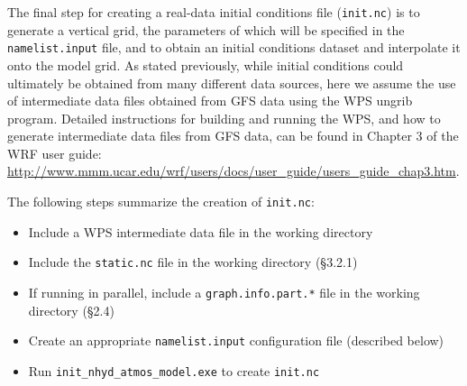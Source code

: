 \documentclass[11pt]{report}
\begin{document}
The final step for creating a real-data initial conditions file ({\tt init.nc}) is to generate a vertical grid, the parameters of which will be specified in the {\tt namelist.input} file, and to obtain an initial conditions dataset and interpolate it onto the model grid. As stated previously, while initial conditions could ultimately be obtained from many different data sources, here we assume the use of intermediate data files obtained from GFS data using the WPS ungrib program.  Detailed instructions for building and running the WPS, and how to generate intermediate data files from GFS data, can be found in Chapter 3 of the WRF user guide: \\
\url{http://www.mmm.ucar.edu/wrf/users/docs/user\_guide/users\_guide\_chap3.htm}.

The following steps summarize the creation of {\tt init.nc}:

\begin{itemize}
\item Include a WPS intermediate data file in the working directory
\item Include the {\tt static.nc} file in the working directory (\S 3.2.1)
\item If running in parallel, include a {\tt graph.info.part.*} file in the working directory (\S 2.4)
\item Create an appropriate {\tt namelist.input} configuration file (described below)
\item Run {\tt init\_nhyd\_atmos\_model.exe} to create {\tt init.nc}
\end{itemize}
\end{document}
